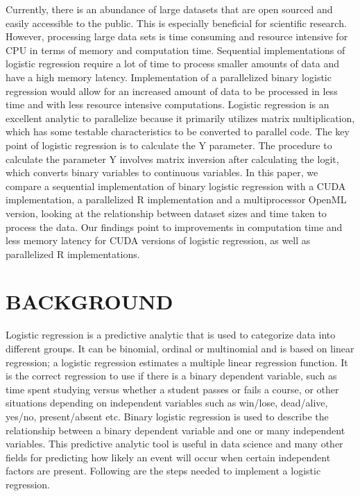\documentclass[letterpaper, 10 pt, conference]{ieeeconf}  %
\begin{document}
Currently, there is an abundance of large datasets that are open sourced and easily accessible to the public. This is especially beneficial for scientific research. However, processing large data sets is time consuming and resource intensive for CPU in terms of memory and computation time. Sequential implementations of logistic regression require a lot of time to process smaller amounts of data and have a high memory latency. Implementation of a parallelized binary logistic regression would allow for an increased amount of data to be processed in less time and with less resource intensive computations. Logistic regression is an excellent analytic to parallelize because it primarily utilizes matrix multiplication, which has some testable characteristics to be converted to parallel code. The key point of logistic regression is  to calculate the Y parameter. The procedure to calculate the parameter Y involves matrix inversion after calculating the logit, which converts binary variables to continuous variables. In this paper, we compare a sequential implementation of binary logistic regression with a CUDA implementation, a parallelized R implementation and a multiprocessor OpenML version, looking at the relationship between dataset sizes and time taken to process the data. Our findings point to improvements in computation time and less memory latency for CUDA versions of logistic regression, as well as parallelized R implementations.


\section{BACKGROUND}

Logistic regression is a predictive analytic that is used to categorize data into different groups. It can be binomial, ordinal or multinomial and is based on linear regression; a logistic regression estimates a multiple linear regression function. It is the correct regression to use if there is a binary dependent variable, such as time spent studying versus whether a student passes or fails a course, or other situations depending on independent variables such as win/lose, dead/alive, yes/no, present/absent etc. Binary logistic regression is used to describe the relationship between a binary dependent variable and one or many independent variables. This predictive analytic tool is useful in data science and many other fields for predicting how likely an event will occur when certain independent factors are present. Following are the steps needed to implement a logistic regression.
\end{document}
